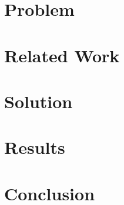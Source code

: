 \documentclass{sig-alternate-05-2015}
\begin{document}
\section{Problem}


\section{Related Work}

\section{Solution}

\section{Results}

\section{Conclusion}


 

%
%
\appendix
\end{document}
